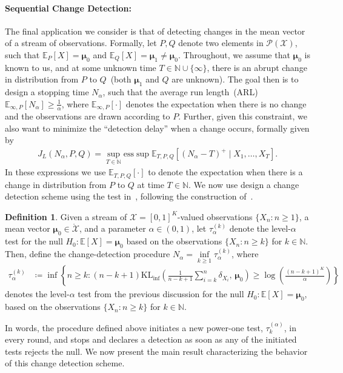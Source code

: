\documentclass{article}
\theoremstyle{plain}
\theoremstyle{definition}
\newtheorem{definition}[definition]{Definition}
\newcommand{\KLinf}{\operatorname{KL_{inf}}}
\newcommand{\calP}{\mathcal P}
\newcommand{\calX}{\mathcal X}
\newcommand{\boldmu}{\boldsymbol{\mu}}
\begin{document}
\paragraph{Sequential Change Detection:} The final application we consider is that of detecting changes in the mean vector of a stream of observations. Formally, let $P, Q$ denote two elements in $\calP(\calX)$, such that $\mathbb{E}_P[X] = \boldmu_0$ and $\mathbb{E}_Q[X] = \boldmu_1 \neq \boldmu_0$. Throughout, we assume that $\boldmu_0$ is known to us, and at some unknown time $T \in \mathbb{N} \cup \{\infty\}$, there is an abrupt change in distribution from $P$ to $Q$~(both $\boldmu_1$ and $Q$ are unknown). The goal then is to design a stopping time $N_\alpha$, such that  the average run length~(ARL)
$\mathbb{E}_{\infty, P}[N_\alpha] \geq \frac{1}{\alpha}$, where $\mathbb{E}_{\infty, P}[\cdot]$ denotes the expectation when there is no change and the observations are drawn according to $P$. Further, given this constraint, we also want to minimize the  ``detection delay'' when a change occurs, formally given by  
\begin{align}
J_L(N_\alpha, P, Q) = \sup_{T \in \mathbb{N}} \mathrm{ess}\sup \mathbb{E}_{T, P, Q}[(N_\alpha-T)^+ \mid X_1, \ldots, X_T]. 
\end{align}
In these expressions we use $\mathbb{E}_{T, P, Q}[\cdot]$ to denote the expectation when there is a change in distribution from $P$ to $Q$ at time $T \in \mathbb{N}$. 
We now use design a change detection scheme using  the test in~,  following the construction of~\citet{lorden1971procedures}. 
\begin{definition}
    \label{def:change-detection} Given a stream of $\calX = [0,1]^K$-valued observations $\{X_n: n \geq 1\}$,  a mean vector $\boldmu_0 \in \mathring{\calX}$, and a parameter $\alpha \in (0,1)$, let $\tau_\alpha^{(k)}$ denote the level-$\alpha$ test for the null $H_0: \mathbb{E}[X] = \boldmu_0$ based on the observations $\{X_n: n \geq k\}$ for $k \in \mathbb{N}$. Then, define the change-detection procedure $N_\alpha = \inf\limits_{k \geq 1} \tau_\alpha^{(k)}$, where 
    \begin{align}
        \tau^{(k)}_{\alpha} &\coloneqq \inf \left\{n \geq k:  (n-k+1) \KLinf\left( \frac{1}{n-k+1} \sum_{i=k}^n \delta_{X_i}, \, \boldmu_0\right) \geq \log \left( \frac{(n-k+1)^K}{\alpha} \right) \right\} 
    \end{align}
    denotes the level-$\alpha$ test from the previous discussion for the null $H_0: \mathbb{E}[X]=\boldmu_0$, based on the observations $\{X_n: n \geq k\}$ for $k \in \mathbb{N}$. 
\end{definition}
In words, the procedure defined above initiates a new power-one test, $\tau_k^{(\alpha)}$, in every round, and stops and declares a detection as soon as any of the initiated tests rejects the null. 
We now present the main result characterizing the behavior of this change detection scheme.  
\end{document}
